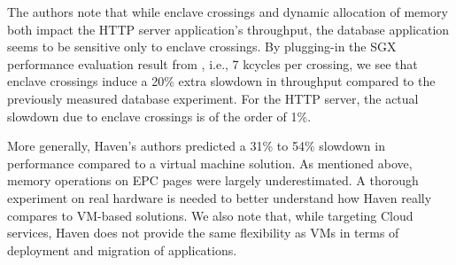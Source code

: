 The authors note that while enclave crossings and dynamic allocation of memory both impact the HTTP server application's throughput, the database application seems to be sensitive only to enclave crossings.
By plugging-in the SGX performance evaluation result from \cite{DBLP:conf/IEEEwisa/ZhaoSTZX16}, i.e., 7 kcycles per crossing, we see that enclave crossings induce a 20\% extra slowdown in throughput compared to the previously measured database experiment.
For the HTTP server, the actual slowdown due to enclave crossings is of the order of 1\%.

More generally, Haven's authors predicted a 31\% to 54\% slowdown in performance compared to a virtual machine solution.
As mentioned above, memory operations on EPC pages were largely underestimated.
A thorough experiment on real hardware is needed to better understand how Haven really compares to VM-based solutions.
We also note that, while targeting Cloud services, Haven does not provide the same flexibility as VMs in terms of deployment and migration of applications.
